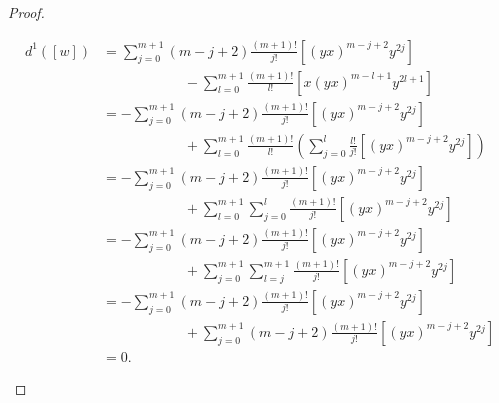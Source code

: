 \documentclass[fleqn,../tesis.tex]{subfiles}
\begin{document}
\begin{proof}
\begin{itemize}
			\begin{align*}
				d^1(\left[w\right]) &=
					\sum_{j = 0}^{m + 1}(m - j + 2)\frac{(m + 1)!}{j!}\left[(yx)^{m -j + 2}y^{2j}\right]\\
				& \hspace{70pt}-\sum_{l = 0}^{m + 1}\frac{(m + 1)!}{l!}\left[x(yx)^{m - l + 1}y^{2l + 1}\right] \\
				&=-\sum_{j = 0}^{m + 1}(m - j + 2)\frac{(m + 1)!}{j!}\left[(yx)^{m -j + 2}y^{2j}\right]\\
				& \hspace{70pt} + \sum_{l = 0}^{m + 1}\frac{(m + 1)!}{l!}
					\left(\sum_{j = 0}^l\frac{l!}{j!}\left[(yx)^{m - j + 2}y^{2j}\right]\right) \\
				&= -	\sum_{j = 0}^{m + 1}(m - j + 2)\frac{(m + 1)!}{j!}\left[(yx)^{m -j + 2}y^{2j}\right]\\
				& \hspace{70pt} + \sum_{l = 0}^{m + 1}\sum_{j = 0}^{l}\frac{(m + 1)!}{j!}
					\left[(yx)^{m - j + 2}y^{2j}\right]\\
				&= -	\sum_{j = 0}^{m + 1}(m - j + 2)\frac{(m + 1)!}{j!}\left[(yx)^{m -j + 2}y^{2j}\right]\\
				& \hspace{70pt} + \sum_{j = 0}^{m + 1}\sum_{l = j}^{m + 1}\frac{(m + 1)!}{j!}
					\left[(yx)^{m - j + 2}y^{2j}\right]\\
				&= -	\sum_{j = 0}^{m + 1}(m - j + 2)\frac{(m + 1)!}{j!}\left[(yx)^{m -j + 2}y^{2j}\right]\\
				& \hspace{70pt} + \sum_{j = 0}^{m + 1}(m - j + 2)\frac{(m + 1)!}{j!}
					\left[(yx)^{m - j + 2}y^{2j}\right]\\
				&= 0.
			\end{align*}	 
	\end{itemize}
\end{proof}
\end{document}
